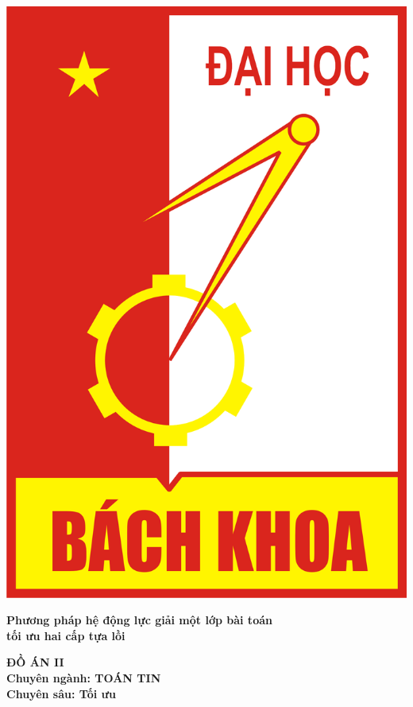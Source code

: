 \documentclass[oneside, a4paper]{book}
\theoremstyle{plain}
\theoremstyle{definition}
\theoremstyle{remark}
\begin{document}
\begin{center}
	\fontsize{17pt}{15pt}\selectfont
	\includegraphics[scale=0.06]{HUST_logo}
	\vspace{1cm}
	
	\fontsize{22pt}{15pt}\selectfont
	\bfseries Phương pháp hệ động lực giải một lớp bài toán\\
                    tối ưu hai cấp tựa lồi
\end{center}

\vspace{0.8cm}
\begin{center}
	\fontsize{16pt}{16pt}\selectfont 	
	{\bfseries ĐỒ ÁN II}\\	
	\fontsize{14pt}{16pt}\selectfont
	{\bfseries Chuyên ngành: TOÁN TIN}\\
	\fontsize{14pt}{16pt}\selectfont
	{\bfseries Chuyên sâu: Tối ưu}\\
\end{center}
\end{document}
